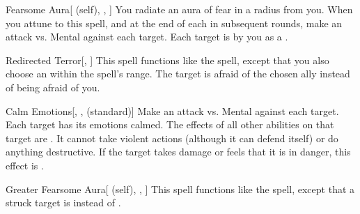 \lowercase{\hypertarget{spell:Fearsome Aura}{}}\label{spell:Fearsome Aura}
\begin{attuneability}[\nth{2}]{\hypertarget{spell:Fearsome Aura}{Fearsome Aura}}[ (self), , ]
You radiate an aura of fear in a \areamed radius  from you.
When you attune to this spell, and at the end of each  in subsequent rounds, make an attack vs. Mental against each target.
\hit Each target is  by you as a .
\end{attuneability}
\vspace{0.25em}



\lowercase{\hypertarget{spell:Redirected Terror}{}}\label{spell:Redirected Terror}
\begin{freeability}[\nth{2}]{\hypertarget{spell:Redirected Terror}{Redirected Terror}}[, ]
This spell functions like the  spell, except that you also choose an  within the spell's range.
The target is afraid of the chosen ally instead of being afraid of you.
\end{freeability}
\vspace{0.25em}



\lowercase{\hypertarget{spell:Calm Emotions}{}}\label{spell:Calm Emotions}
\begin{freeability}[\nth{3}]{\hypertarget{spell:Calm Emotions}{Calm Emotions}}[, ,  (standard)]
Make an attack vs. Mental against each target.
\hit Each target has its emotions calmed.
The effects of all other  abilities on that target are .
It cannot take violent actions (although it can defend itself) or do anything destructive.
If the target takes damage or feels that it is in danger, this effect is .
\end{freeability}
\vspace{0.25em}



\lowercase{\hypertarget{spell:Greater Fearsome Aura}{}}\label{spell:Greater Fearsome Aura}
\begin{attuneability}[\nth{4}]{\hypertarget{spell:Greater Fearsome Aura}{Greater Fearsome Aura}}[ (self), , ]
This spell functions like the  spell, except that a struck target is  instead of .
\end{attuneability}
\vspace{0.25em}



